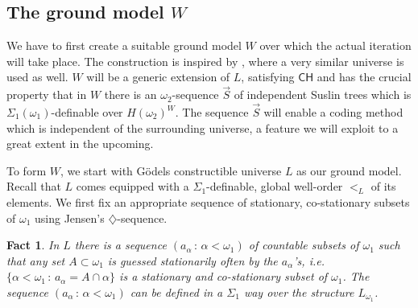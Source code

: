 \documentclass[a4paper,12pt]{article}
\newtheorem{fact}[theorem]{Fact}
\newcommand{\CH}{\mathsf{CH}}
\begin{document}
\subsection{The ground model $W$}

We have to first create a suitable ground model $W$ over which the actual iteration will take place. The construction is inspired by \cite{Ho2}, where a very similar universe is used as well. $W$ will be a generic extension of $L$, satisfying $\CH$ and has the crucial property that in $W$ there is an $\omega_2$-sequence $\vec{S}$ of independent Suslin trees which is $\Sigma_1(\omega_1)$-definable over $H(\omega_2)^W$. The sequence $\vec{S}$ will enable a coding method which is independent of the surrounding universe, a feature we will exploit to a great extent in the upcoming.

To form $W$, we start with G\"odels constructible universe $L$ as our 
ground model. Recall that $L$ comes equipped with a $\Sigma_1$-definable, global well-order $<_L$ of its elements.
We first fix an appropriate sequence of stationary, co-stationary subsets of $\omega_1$ using Jensen's $\diamondsuit$-sequence.
\begin{fact}
In $L$ there is a sequence $(a_{\alpha} \, : \, \alpha < \omega_1)$ of countable subsets of $\omega_1$
such that any set $A \subset \omega_1$ is guessed stationarily often by the $a_{\alpha}$'s, i.e.
$\{ \alpha < \omega_1 \, : \, a_{\alpha}= A \cap \alpha \}$ is a stationary and co-stationary subset of $\omega_1$. The sequence $(a_{\alpha} \, : \, \alpha < \omega_1)$ can be defined in a $\Sigma_1$ way over the structure $L_{\omega_1}$.
\end{fact}
\end{document}
